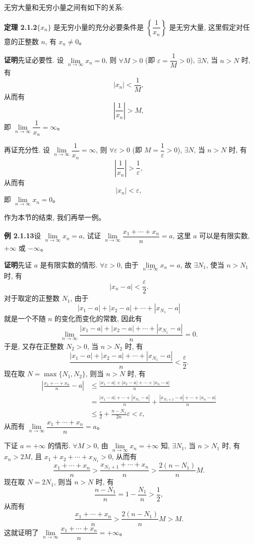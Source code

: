 \documentclass[UTF8, 12pt, fontset=fandol, oneside]{ctexart}
\begin{document}
无穷大量和无穷小量之间有如下的关系:

\noindent\textbf{定理 2.1.2}\quad $\{x_n\}$ 是无穷小量的充分必要条件是 $\left\{\dfrac1{x_n}\right\}$ 是无穷大量, 这里假定对任意的正整数 $n$, 有 $x_n\ne0$。

\noindent\textbf{证明}\quad 先证必要性. 设 $\lim\limits_{n\to\infty}x_n=0$, 则 $\forall M>0$ (即 $\varepsilon=\dfrac1M>0$), $\exists N$, 当 $n>N$ 时, 有
\[
  |x_n|<\frac1M,
\]
从而有
\[
  \left|\frac1{x_n}\right|>M,
\]
即 $\lim\limits_{n\to\infty}\dfrac1{x_n}=\infty$。

再证充分性. 设 $\lim\limits_{n\to\infty}\dfrac1{x_n}=\infty$, 则 $\forall\varepsilon>0$ (即 $M=\dfrac1\varepsilon>0$), $\exists N$, 当 $n>N$ 时, 有
\[
  \left|\frac1{x_n}\right|>\frac1\varepsilon,
\]
从而有
\[
  |x_n|<\varepsilon,
\]
即 $\lim\limits_{n\to\infty}x_n=0$。

作为本节的结束, 我们再举一例。

\noindent\textbf{例 2.1.13}\quad 设 $\lim\limits_{n\to\infty}x_n=a$, 试证 $\lim\limits_{n\to\infty}\dfrac{x_1+\cdots+x_n}{n}=a$, 这里 $a$ 可以是有限实数, $+\infty$ 或 $-\infty$。

\noindent\textbf{证明}\quad 先证 $a$ 是有限实数的情形. $\forall\varepsilon>0$, 由于 $\lim\limits_{n\to\infty}x_n=a$, 故 $\exists N_1$, 使当 $n>N_1$ 时, 有
\[
  |x_n-a|<\frac\varepsilon2.
\]
对于取定的正整数 $N_1$, 由于
\[
  |x_1-a|+|x_2-a|+\cdots+|x_{N_1}-a|
\]
就是一个不随 $n$ 的变化而变化的常数, 因此有
\[
  \lim_{n\to\infty}
  \frac{|x_1-a|+|x_2-a|+\cdots+|x_{N_1}-a|}{n}=0.
\]
于是, 又存在正整数 $N_2>0$, 当 $n>N_2$ 时, 有
\[
  \frac{|x_1-a|+|x_2-a|+\cdots+|x_{N_1}-a|}{n}<\frac\varepsilon2.
\]
现在取 $N=\max\{N_1,N_2\}$, 则当 $n>N$ 时, 有
\[
\begin{aligned}
  \left|\frac{x_1+\cdots+x_n}{n}-a\right|
  &\leqslant
  \frac{|x_1-a|+|x_2-a|+\cdots+|x_n-a|}{n}\\
  &=
  \frac{|x_1-a|+\cdots+|x_{N_1}-a|}{n}
  +
  \frac{|x_{N_1+1}-a|+\cdots+|x_n-a|}{n}\\
  &\leqslant \frac\varepsilon2+\frac{n-N_1}{2n}\varepsilon<\varepsilon,
\end{aligned}
\]
从而有 $\lim\limits_{n\to\infty}\dfrac{x_1+\cdots+x_n}{n}=a$。

下证 $a=+\infty$ 的情形. $\forall M>0$, 由 $\lim\limits_{n\to\infty}x_n=+\infty$ 知, $\exists N_1$, 当 $n>N_1$ 时, 有 $x_n>2M$, 且 $x_1+x_2+\cdots+x_{N_1}>0$, 从而有
\[
  \frac{x_1+\cdots+x_n}{n}
  >
  \frac{x_{N_1+1}+\cdots+x_n}{n}
  >
  \frac{2(n-N_1)}nM.
\]
现在取 $N=2N_1$, 则当 $n>N$ 时, 有
\[
  \frac{n-N_1}{n}=1-\frac{N_1}{n}>\frac12,
\]
从而有
\[
  \frac{x_1+\cdots+x_n}{n}
  >
  \frac{2(n-N_1)}nM>M.
\]
这就证明了 $\lim\limits_{n\to\infty}\dfrac{x_1+\cdots+x_n}{n}=+\infty$。
\end{document}
